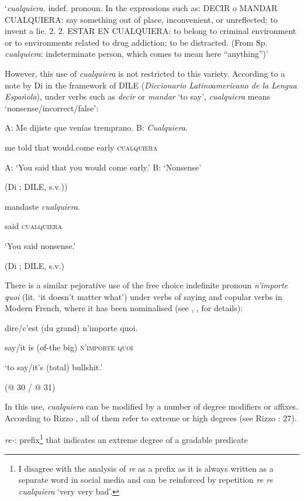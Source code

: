 ‘\textit{cualquiera.} indef. pronoun. In the expressions such as: DECIR o MANDAR CUALQUIERA: say something out of place, inconvenient, or unreflected; to invent a lie. {\textbar} 2. 2. ESTAR EN CUALQUIERA: to belong to criminal environment or to environments related to drug addiction; to be distracted. (From Sp. \textit{cualquiera}: indeterminate person, which comes to mean here “anything”)’

However, this use of \textit{cualquiera} is not restricted to this variety. According to a note by Di \citet{Tullio2015} in the framework of DILE (\textit{Diccionario Latinoamericano de la Lengua Española}), under verbs such as \textit{decir} or \textit{mandar} ‘to say’, \textit{cualquiera} means ‘nonsense/incorrect/false’:

  A:   Me  dijiste  que  venías tremprano.  B:   \textit{Cualquiera}.

    me  told  that  would.come  early     \textsc{cualquiera}

  A: ‘You said that you would come early.’ B: ‘Nonsense’

    (Di \citealt{Tullio2015}; DILE, s.v.))

  mandaste  \textit{cualquiera}.  

  said  \textsc{cualquiera}  

  ‘You said nonsense.’

(Di \citealt{Tullio2015}; DILE, s.v.)

There is a similar pejorative use of the free choice indefinite pronoun \textit{n’importe quoi} (lit. ‘it doesn’t matter what’) under verbs of saying and copular verbs in Modern French, where it has been nominalised (see \citealt{Paillard1997}, \citealt{Pescarini2009},  for details):

  dire/c’est   (du grand)  n’importe quoi.

  say/it is  (of-the big)  \textsc{n’importe} \textsc{quoi}

  ‘to say/it’s (total) bullshit.’

  (@ 30 / @ 31)

In this use, \textit{cualquiera} can be modified by a number of degree modifiers or affixes. According to Rizzo \citet{Salierno2013}, all of them refer to extreme or high degrees (see Rizzo \citealt{Salierno2013}: 27).

  \textit{re-}: prefix\footnote{{I disagree with the analysis of} {\textit{re}} {as a prefix as it is always written as a separate word in social media and can be reinforced by repetition} {\textit{re re cualquiera}} {‘very very bad’.}}  that indicates an extreme degree of a gradable predicate


